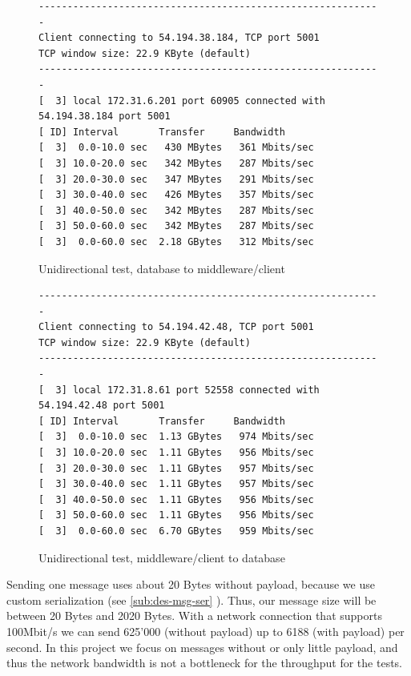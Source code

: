 \documentclass[milestone1.tex]{subfiles}
\begin{document}
\begin{figure}[H]
\begin{center}
\begin{verbatim}
------------------------------------------------------------
Client connecting to 54.194.38.184, TCP port 5001
TCP window size: 22.9 KByte (default)
------------------------------------------------------------
[  3] local 172.31.6.201 port 60905 connected with 54.194.38.184 port 5001
[ ID] Interval       Transfer     Bandwidth
[  3]  0.0-10.0 sec   430 MBytes   361 Mbits/sec
[  3] 10.0-20.0 sec   342 MBytes   287 Mbits/sec
[  3] 20.0-30.0 sec   347 MBytes   291 Mbits/sec
[  3] 30.0-40.0 sec   426 MBytes   357 Mbits/sec
[  3] 40.0-50.0 sec   342 MBytes   287 Mbits/sec
[  3] 50.0-60.0 sec   342 MBytes   287 Mbits/sec
[  3]  0.0-60.0 sec  2.18 GBytes   312 Mbits/sec
\end{verbatim}
\end{center}
\caption{Unidirectional test, database to middleware/client}
\label{fig:iperfserver}
\end{figure}


\begin{figure}[H]
\begin{center}
\begin{verbatim}
------------------------------------------------------------
Client connecting to 54.194.42.48, TCP port 5001
TCP window size: 22.9 KByte (default)
------------------------------------------------------------
[  3] local 172.31.8.61 port 52558 connected with 54.194.42.48 port 5001
[ ID] Interval       Transfer     Bandwidth
[  3]  0.0-10.0 sec  1.13 GBytes   974 Mbits/sec
[  3] 10.0-20.0 sec  1.11 GBytes   956 Mbits/sec
[  3] 20.0-30.0 sec  1.11 GBytes   957 Mbits/sec
[  3] 30.0-40.0 sec  1.11 GBytes   957 Mbits/sec
[  3] 40.0-50.0 sec  1.11 GBytes   956 Mbits/sec
[  3] 50.0-60.0 sec  1.11 GBytes   956 Mbits/sec
[  3]  0.0-60.0 sec  6.70 GBytes   959 Mbits/sec

\end{verbatim}
\end{center}
\caption{Unidirectional test, middleware/client to database}
\label{fig:iperfserver2}
\end{figure}

Sending one message uses about 20 Bytes without payload, because we use custom serialization (see \ref{sub:des-msg-ser} ). Thus, our message size will be between 20 Bytes and 2020 Bytes. With a network connection that supports 100Mbit/s we can send 625'000 (without payload) up to 6188 (with payload) per second. In this project we focus on messages without or only little payload, and thus the network bandwidth is not a bottleneck for the throughput for the tests.
\end{document}
